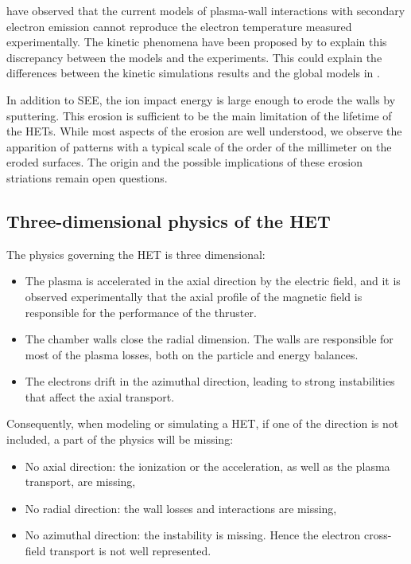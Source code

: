   
  \citet{raitses2005} have observed that the current models of plasma-wall interactions with secondary electron emission cannot reproduce the electron temperature measured experimentally.
  The kinetic phenomena have been proposed by \citet{sydorenko2007} to explain this discrepancy between the models and the experiments.
  This could explain the differences between the kinetic simulations results and the global models in \citet{croes2017}.   
    
  \vspace{1em}
  In addition to \ac{SEE}, the ion impact energy is large enough to erode the walls by sputtering.
  This erosion is sufficient to be the main limitation of the lifetime of the \ac{HET}s.
  While most aspects of the erosion are well understood, we observe the apparition of  patterns with a typical scale of the order of the millimeter on the eroded surfaces.
  The origin and the possible implications of these erosion striations remain open questions.
  

\subsection*{Three-dimensional physics of the HET}
\label{sec-3Dphi}

The physics governing the \ac{HET} is three dimensional\string:
\begin{itemize}
  \item The plasma is accelerated in the axial direction by the electric field, and it is observed experimentally that the axial profile of the magnetic field is responsible for the performance of the thruster.
  \item The chamber walls close the radial dimension. The walls are responsible for most of the plasma losses, both on the particle and energy balances.
  \item The electrons drift in the azimuthal direction, leading to strong instabilities that affect the axial transport.
\end{itemize}

Consequently, when modeling or simulating a \ac{HET}, if one of the direction is not included, a part of the physics will be missing\string:
\begin{itemize}
  \item No axial direction\string: the ionization or the acceleration, as well as the plasma transport, are missing,
  \item No radial direction\string: the wall losses and interactions are missing,
  \item No azimuthal direction\string: the instability is missing. Hence the electron cross-field transport is not well represented.
\end{itemize}

